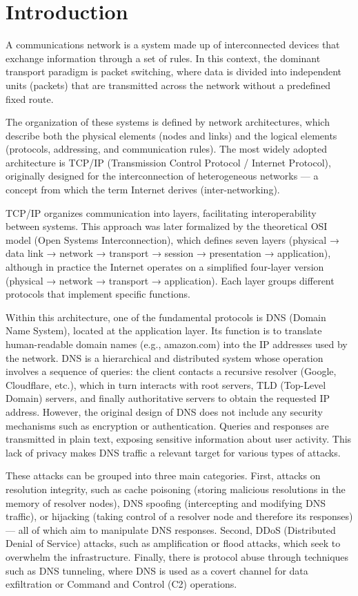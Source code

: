\chapter{Introduction}
A communications network is a system made up of interconnected devices that exchange information through a set of rules. In this context, the dominant transport paradigm is packet switching, where data is divided into independent units (packets) that are transmitted across the network without a predefined fixed route.

The organization of these systems is defined by network architectures, which describe both the physical elements (nodes and links) and the logical elements (protocols, addressing, and communication rules). The most widely adopted architecture is TCP/IP (Transmission Control Protocol / Internet Protocol), originally designed for the interconnection of heterogeneous networks — a concept from which the term Internet derives (inter-networking).

TCP/IP organizes communication into layers, facilitating interoperability between systems. This approach was later formalized by the theoretical OSI model (Open Systems Interconnection), which defines seven layers (physical → data link → network → transport → session → presentation → application), although in practice the Internet operates on a simplified four-layer version (physical → network → transport → application). Each layer groups different protocols that implement specific functions.

Within this architecture, one of the fundamental protocols is DNS (Domain Name System), located at the application layer. Its function is to translate human-readable domain names (e.g., amazon.com) into the IP addresses used by the network. DNS is a hierarchical and distributed system whose operation involves a sequence of queries: the client contacts a recursive resolver (Google, Cloudflare, etc.), which in turn interacts with root servers, TLD (Top-Level Domain) servers, and finally authoritative servers to obtain the requested IP address.
However, the original design of DNS does not include any security mechanisms such as encryption or authentication. Queries and responses are transmitted in plain text, exposing sensitive information about user activity. This lack of privacy makes DNS traffic a relevant target for various types of attacks.

These attacks can be grouped into three main categories. First, attacks on resolution integrity, such as cache poisoning (storing malicious resolutions in the memory of resolver nodes), DNS spoofing (intercepting and modifying DNS traffic), or hijacking (taking control of a resolver node and therefore its responses) — all of which aim to manipulate DNS responses. Second, DDoS (Distributed Denial of Service) attacks, such as amplification or flood attacks, which seek to overwhelm the infrastructure. Finally, there is protocol abuse through techniques such as DNS tunneling, where DNS is used as a covert channel for data exfiltration or Command and Control (C2) operations.

